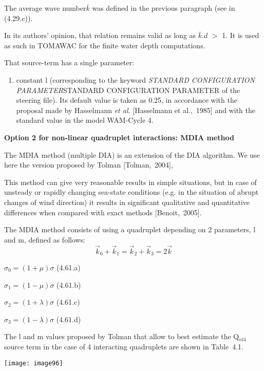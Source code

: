  The average wave number$\bar{k}$ was defined in the previous paragraph (see in (4.29.c)).

 In its authors' opinion, that relation remains valid as long as $\bar{k}.d$ $>$ 1. It is used as such in TOMAWAC for the finite water depth computations.

 That source-term has a single parameter:

\begin{enumerate}
\item  constant l (corresponding to the keyword \textit{STANDARD CONFIGURATION PARAMETER}STANDARD CONFIGURATION PARAMETER\textit{ }of the steering file). Its default value is taken as 0.25, in accordance with the proposal made by Hasselmann \textit{et al.} [Hasselmann et al.,~1985] and with the standard value in the model WAM-Cycle 4.
\end{enumerate}


{\bf  Option 2 for non-linear quadruplet interactions: MDIA method}

 The MDIA method (multiple DIA) is an extension of the DIA algorithm. We use here the version proposed by Tolman [Tolman,~2004],

 This method can give very reasonable results in simple situations, but in case of unsteady or rapidly changing sea-state conditions (e.g. in the situation of abrupt changes of wind direction) it results in significant qualitative and quantitative differences when compared with exact methods [Benoit,~2005].

 The MDIA method consists of using a quadruplet depending on 2 parameters, l and m, defined as follows:
\begin{equation} \label{GrindEQ__4_60_}
\vec{k}_{0} +\vec{k}_{1} =\vec{k}_{2} +\vec{k}_{3} =2\vec{k}
\end{equation}

$\sigma _{0} =(1+\mu )\sigma $ (4.61.a)

$\sigma _{1} =(1-\mu )\sigma $ (4.61.b)

$\sigma _{2} =(1+\lambda )\sigma $ (4.61.c)

$\sigma _{3} =(1-\lambda )\sigma $ (4.61.d)

 The l and m values proposed by Tolman that allow to best estimate the Q${}_{nl4}$ source term in the case of 4 interacting quadruplets are shown in Table~4.1.

 \texttt{[image: image96]}

